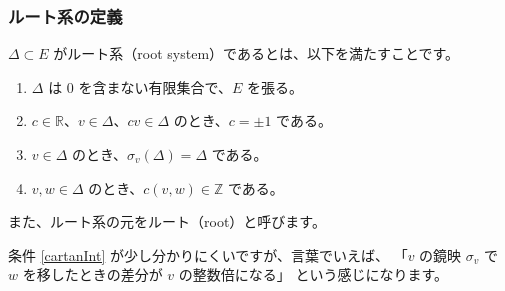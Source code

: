 \documentclass{beamer}
\begin{document}
\begin{frame}
    \frametitle{ルート系の定義}

    \begin{definition}[ルート系]
        \(\Delta \subset E\) がルート系（root system）であるとは、以下を満たすことです。

        \begin{enumerate}
            \item \(\Delta \) は \(0\) を含まない有限集合で、\(E\) を張る。
            \item \(c \in \mathbb{R}\)、\(v \in \Delta \)、\(cv \in \Delta \)
                  のとき、\(c = \pm 1\) である。
            \item \(v \in \Delta \) のとき、\(\sigma_v(\Delta) = \Delta \) である。
            \item\label{cartanInt} \(v, w \in \Delta \) のとき、\(c(v,w) \in \mathbb{Z}\) である。
        \end{enumerate}

        また、ルート系の元をルート（root）と呼びます。
    \end{definition}

    条件 \ref{cartanInt} が少し分かりにくいですが、言葉でいえば、
    「\(v\) の鏡映 \(\sigma_v\) で \(w\) を移したときの差分が \(v\) の整数倍になる」
    という感じになります。
\end{frame}
\end{document}
